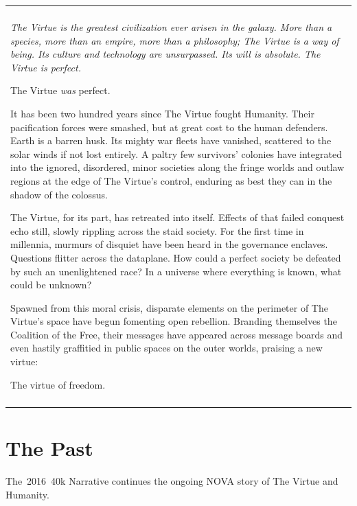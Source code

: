 \documentclass{novanarrative}
\begin{document}
\bigskip
\begin{center}  
\begin{tabular}{L{6in}}
  \hline\\
  {\it
  The Virtue is the greatest civilization ever arisen in the galaxy.
  More than a species, more than an empire, more than a philosophy; The
  Virtue is a way of being.  Its culture and technology
  are unsurpassed.  Its will is absolute.  The Virtue is perfect.

  \bigskip
  The Virtue \emph{was} perfect.

  \bigskip
  It has been two hundred years since The Virtue fought Humanity.  Their
  pacification forces were smashed, but at great cost to the human
  defenders.  Earth is a barren husk.  Its mighty war fleets have
  vanished, scattered to the solar winds if not lost entirely.  A paltry
  few survivors' colonies have integrated into the ignored, disordered, minor
  societies along the fringe worlds and outlaw regions at the edge of The Virtue's control,
  enduring as best they can
  in the shadow of the colossus.

  \smallskip
  The Virtue, for its part, has retreated into itself.  Effects of that
  failed conquest echo still, slowly rippling across the staid society.
  For the first time in millennia, murmurs of disquiet have been heard
  in the governance enclaves.  Questions flitter across the dataplane.
  How could a perfect society be defeated by such an unenlightened race?
  In a universe where everything is known, what could be unknown?

  \smallskip
  Spawned from this moral crisis, disparate elements on the perimeter of
  The Virtue's space have begun fomenting open rebellion.  Branding themselves
  the Coalition of the Free, their messages have appeared across
  message boards and even hastily graffitied in public spaces on the
  outer worlds, praising a new virtue:

  \bigskip
  \centerline{The virtue of freedom.}
  }
  \\
  \hline\\
\end{tabular}
\end{center}

\section{The Past}

The~2016~40k Narrative continues the ongoing NOVA story of The Virtue
and Humanity.
\end{document}

